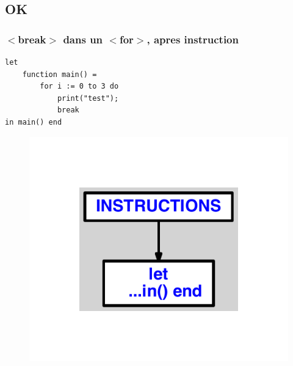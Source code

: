 \documentclass{article}
\begin{document}
\subsection{OK}
\subsubsection{$ < $break$ > $ dans un $ < $for$ > $, apres instruction}
\begin{lstlisting}
let
	function main() =
		for i := 0 to 3 do
			print("test");
			break
in main() end
\end{lstlisting}
\newpage
\begin{figure}[H]
\centering
\includegraphics[max width=\textwidth]{ast/ast_9.pdf}
\end{figure}
\newpage
\end{document}

